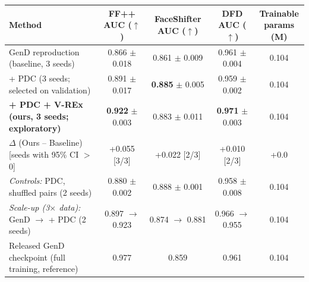 \documentclass[8pt,a4paper]{article}
\begin{document}
\begin{center}


\label{tab:results}

\small

\begin{tabularx}{\linewidth}{
    @{}X c c c c@{}
}

\toprule

\textbf{Method}
&
\makecell{\textbf{FF++ AUC}\\($\uparrow$)}
&
\makecell{\textbf{FaceShifter AUC}\\($\uparrow$)}
&
\makecell{\textbf{DFD AUC}\\($\uparrow$)}
&
\makecell{\textbf{Trainable}\\\textbf{params} (M)}
\\

\midrule

GenD reproduction (baseline, 3 seeds)
&
0.866 $\pm$ 0.018
&
0.861 $\pm$ 0.009
&
0.961 $\pm$ 0.004
&
0.104
\\

+ PDC (3 seeds; selected on validation)
&
0.891 $\pm$ 0.017
&
\textbf{0.885} $\pm$ 0.005
&
0.959 $\pm$ 0.002
&
0.104
\\

\textbf{+ PDC + V-REx (ours, 3 seeds; exploratory)}
&
\textbf{0.922} $\pm$ 0.003
&
0.883 $\pm$ 0.011
&
\textbf{0.971} $\pm$ 0.003
&
0.104
\\

\midrule

$\Delta$ (Ours -- Baseline) [seeds with 95\% CI $>$ 0]
&
+0.055 [3/3]
&
+0.022 [2/3]
&
+0.010 [2/3]
&
+0.0
\\

\midrule

\emph{Controls:} PDC, shuffled pairs (2 seeds)
&
0.880 $\pm$ 0.002
&
0.888 $\pm$ 0.001
&
0.958 $\pm$ 0.008
&
0.104
\\

\emph{Scale-up (3$\times$ data):} GenD $\to$ + PDC (2 seeds)
&
0.897 $\to$ 0.923
&
0.874 $\to$ 0.881
&
0.966 $\to$ 0.955
&
0.104
\\

Released GenD checkpoint (full training, reference)
&
0.977
&
0.859
&
0.961
&
0.104
\\

\bottomrule

\end{tabularx}

\end{center}
\end{document}
